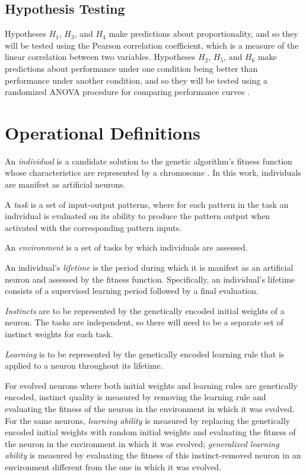 \documentclass[master]{outhesis}
\begin{document}
\section{Hypothesis Testing}

Hypotheses $H_1$, $H_3$, and $H_4$ make predictions about proportionality, 
and so they will be tested using the Pearson correlation coefficient,
which is a measure of the linear correlation between two variables.
Hypotheses $H_2$, $H_5$, and $H_6$ make predictions about performance under one condition being better than performance under another condition,
and so they will be tested using a randomized ANOVA procedure for comparing performance curves \citep{Piater:1998aa}.

\chapter{Operational Definitions}

An \emph{individual} is a candidate solution to the genetic algorithm's fitness function whose characteristics are represented by a chromosome \citep{Engelbrecht:2007aa}. In this work, individuals are manifest as artificial neurons. 

A \emph{task} is a set of input-output patterns,
where for each pattern in the task an individual is evaluated on its ability to produce the pattern output when activated with the corresponding pattern inputs.

An \emph{environment} is a set of tasks by which individuals are assessed.

An individual's \emph{lifetime} is the period during which it is manifest as an artificial neuron and assessed by the fitness function. Specifically, an individual's lifetime consists of a supervised learning period followed by a final evaluation.

\emph{Instincts} are to be represented by the genetically encoded initial weights of a neuron. The tasks are independent, so there will need to be a separate set of instinct weights for each task.

\emph{Learning} is to be represented by the genetically encoded learning rule that is applied to a neuron throughout its lifetime.

For evolved neurons where both initial weights and learning rules are genetically encoded, instinct quality is measured by removing the learning rule and evaluating the fitness of the neuron in the environment in which it was evolved.
For the same neurons, \emph{learning ability} is measured by replacing the genetically encoded initial weights with random initial weights and evaluating the fitness of the neuron in the environment in which it was evolved; \emph{generalized learning ability} is measured by evaluating the fitness of this instinct-removed neuron in an environment different from the one in which it was evolved.
\end{document}
